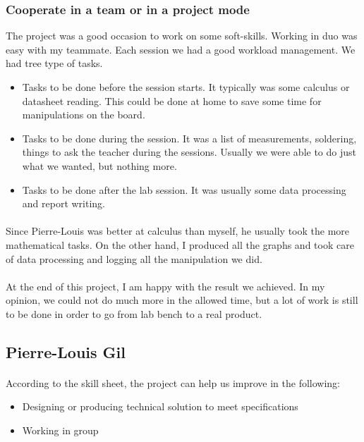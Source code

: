 \documentclass{article}[12pt]
\begin{document}
\begin{appendices}
\subsubsection{Cooperate in a team or in a project mode}
The project was a good occasion to work on some soft-skills. Working in duo was easy with my teammate. Each session we had a good workload management. We had tree type of tasks.
\begin{itemize}
    \item Tasks to be done before the session starts. It typically was some calculus or datasheet reading. This could be done at home to save some time for manipulations on the board.
    \item Tasks to be done during the session. It was a list of measurements, soldering, things to ask the teacher during the sessions. Usually we were able to do just what we wanted, but nothing more.
    \item Tasks to be done after the lab session. It was usually some data processing and report writing.
\end{itemize}
\paragraph{}
Since Pierre-Louis was better at calculus than myself, he usually took the more mathematical tasks. On the other hand, I produced all the graphs and took care of data processing and logging all the manipulation we did.
\paragraph{}
At the end of this project, I am happy with the result we achieved. In my opinion, we could not do much more in the allowed time, but a lot of work is still to be done in order to go from lab bench to a real product.


\newpage
\subsection{Pierre-Louis Gil}
\paragraph{}
According to the skill sheet, the project can help us improve in the following:
\begin{itemize}
    \item  Designing or producing technical solution to meet specifications
    \item Working in group
\end{itemize}

\end{appendices}
\end{document}
